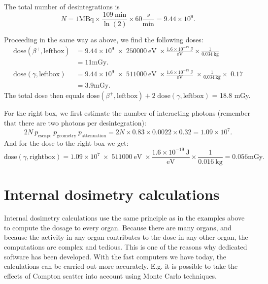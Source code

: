 The total number of desintegrations is 
\begin{equation}
  N = 1 \mbox{MBq} \times \frac{109\ \mbox{min}}{\ln(2)} \times 60
    \frac{s}{\mbox{min}} = 9.44 \times 10^9.
\end{equation}

Proceeding in the same way as above, we find the following doses:
\begin{align}
\mbox{dose}(\beta^+,\mbox{leftbox}) &= 9.44 \times 10^9 \; \times \; 250000
    \ \mbox{eV} \; \times \frac{1.6 \times 10^{-19} \ \mbox{J}}{\mbox{eV}}
        \times \frac{1}{0.034 \ \mbox{kg}}  \nonumber\\
     &= 11 \mbox{mGy}.  \\
\mbox{dose}(\gamma, \mbox{leftbox}) &= 9.44 \times 10^9 \; \times
    \; 511000 \ \mbox{eV} \;
    \times \frac{1.6 \times 10^{-19} \ \mbox{J}}{\mbox{eV}} \;
     \times \frac{1}{0.034\ \mbox{kg}} \times \; 0.17 \nonumber\\
     &= 3.9 \mbox{mGy}.
\end{align}
The total dose then equals $\mbox{dose}(\beta^+,\mbox{leftbox}) + 2 \;
\mbox{dose}(\gamma, \mbox{leftbox})$ = 18.8 mGy.

For the right box, we first estimate the number of interacting photons
(remember that there are two photons per desintegration):
\begin{equation}
  2N \ p_{\mbox{escape}}\ p_{\mbox{geometry}}\ p_{\mbox{attenuation}}
   = 2N \times 0.83 \times 0.0022 \times 0.32 = 1.09 \times 10^7.
\end{equation}
And for the dose to the right box we get:
\begin{equation}
\mbox{dose}(\gamma, \mbox{rightbox}) = 1.09 \times 10^7\; \times \; 511000 \ \mbox{eV} \;
  \times \frac{1.6 \times 10^{-19} \ \mbox{J}}{\mbox{eV}}  \times \frac{1}{0.016\ \mbox{kg}}
   = 0.056 \mbox{mGy}.
\end{equation}


\section{Internal dosimetry calculations}
Internal dosimetry calculations use the same principle as in the
examples above to compute the dosage to every organ. Because there are
many organs, and because the activity in any organ contributes to the
dose in any other organ, the computations are complex and tedious.
This is one of the reasons why dedicated software has been developed.
With the fast computers we have today, the calculations can be carried
out more accurately. E.g.  it is possible to take the effects of
Compton scatter into account using Monte Carlo techniques.

